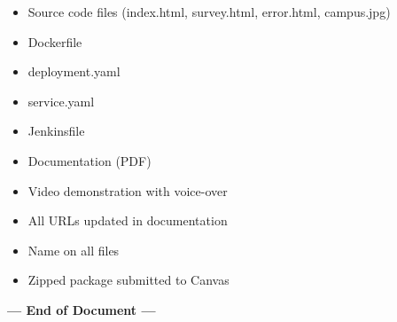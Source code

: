 \documentclass[12pt,a4paper]{article}
\begin{document}
\begin{itemize}
    \item[$\square$] Source code files (index.html, survey.html, error.html, campus.jpg)
    \item[$\square$] Dockerfile
    \item[$\square$] deployment.yaml
    \item[$\square$] service.yaml
    \item[$\square$] Jenkinsfile
    \item[$\square$] Documentation (PDF)
    \item[$\square$] Video demonstration with voice-over
    \item[$\square$] All URLs updated in documentation
    \item[$\square$] Name on all files
    \item[$\square$] Zipped package submitted to Canvas
\end{itemize}

\vfill

\begin{center}
\textbf{--- End of Document ---}
\end{center}
\end{document}
